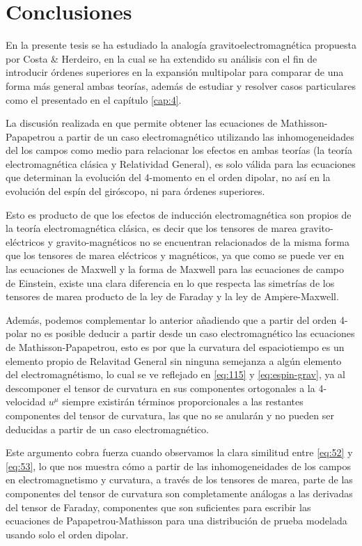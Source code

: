\chapter{Conclusiones}

En la presente tesis se ha estudiado la analogía gravitoelectromagnética propuesta por Costa \& Herdeiro, en la cual se ha extendido su análisis con el fin de introducir órdenes superiores en la expansión multipolar para comparar de una forma más general ambas teorías, además de estudiar y resolver casos particulares como el presentado en el capítulo \ref{cap:4}.

La discusión realizada en \cite{Costa-Herdeiro} que permite obtener las ecuaciones de Mathisson-Papapetrou a partir de un caso electromagnético utilizando las inhomogeneidades del los campos como medio para relacionar los efectos en ambas teorías (la teoría electromagnética clásica y Relatividad General), es solo válida para las ecuaciones que determinan la evolución del 4-momento en el orden dipolar, no así en la evolución del espín del giróscopo, ni para órdenes superiores.

Esto es producto de que los efectos de inducción electromagnética son propios de la teoría electromagnética clásica, es decir que los tensores de marea gravito-eléctricos y gravito-magnéticos no se encuentran relacionados de la misma forma que los tensores de marea eléctricos y magnéticos, ya que como se puede ver en las ecuaciones de Maxwell y la forma de Maxwell para las ecuaciones de campo de Einstein, existe una clara diferencia en lo que respecta las simetrías de los tensores de marea producto de la ley de Faraday y la ley de Amp$\grave{\mathrm{e}}$re-Maxwell.

Además, podemos complementar lo anterior añadiendo que a partir del orden 4-polar no es posible deducir a partir desde un caso electromagnético las ecuaciones de Mathisson-Papapetrou, esto es por que la curvatura del espaciotiempo es un elemento propio de Relavitad General sin ninguna semejanza a algún elemento del electromagnétismo, lo cual se ve reflejado en \eqref{eq:115} y \eqref{eq:espin-grav}, ya al descomponer el tensor de curvatura en sus componentes ortogonales a la 4-velocidad $u^{\mu}$ siempre existirán términos proporcionales a las restantes componentes del tensor de curvatura, las que no se anularán y no pueden ser deducidas a partir de un caso electromagnético.

Este argumento cobra fuerza cuando observamos la clara similitud entre \eqref{eq:52} y \eqref{eq:53}, lo que nos muestra cómo a partir de las inhomogeneidades de los campos en electromagnetismo y curvatura, a través de los tensores de marea, parte de las componentes del tensor de curvatura son completamente análogas a las derivadas del tensor de Faraday, componentes que son suficientes para escribir las ecuaciones de Papapetrou-Mathisson para una distribución de prueba modelada usando solo el orden dipolar.